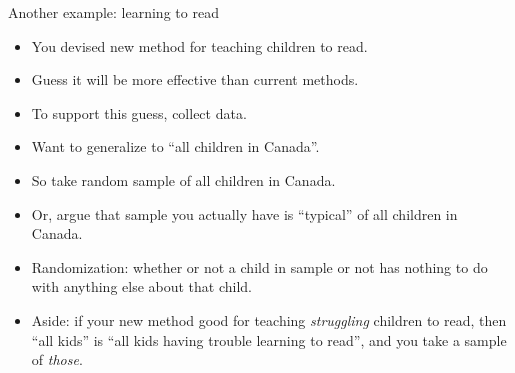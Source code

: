 \documentclass[unknownkeysallowed]{beamer}\usepackage[]{graphicx}\usepackage[]{color}
\begin{document}
%  
%    
%    
%  
%  
%
%
%
%
%  
%
%
%
%
%  


\begin{frame}{Another example: learning to read}

  \begin{itemize}
  \item You devised new method for teaching children to read.
  \item Guess it will be more effective than current methods.
  \item To support this guess, collect data.
  \item Want to generalize to ``all children in Canada''.
  \item So take random sample of all children in Canada.
  \item Or, argue that sample you actually have is ``typical'' of all
    children in Canada.
  \item Randomization: whether or not a child in sample or not has
    nothing to do with anything else about that child.
  \item Aside: if your new method good for 
    teaching \emph{struggling} children to read, then ``all
    kids'' is ``all kids having trouble learning to
    read'', and you take a sample of \emph{those}.
  \end{itemize}
  
\end{frame}
\end{document}

